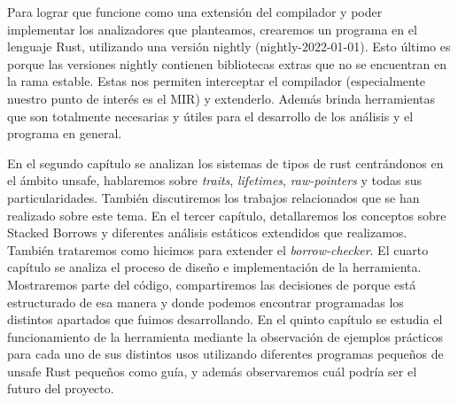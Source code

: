 Para lograr que funcione como una extensión del compilador y poder implementar los analizadores que planteamos, crearemos un programa en el lenguaje Rust, utilizando una versión nightly (nightly-2022-01-01). Esto último es porque las versiones nightly contienen bibliotecas extras que no se encuentran en la rama estable. Estas nos permiten interceptar el compilador (especialmente nuestro punto de interés es el MIR) y extenderlo. Además brinda herramientas que son totalmente necesarias y útiles para el desarrollo de los análisis y el programa en general.

En el segundo capítulo se analizan los sistemas de tipos de rust centrándonos en el ámbito unsafe, hablaremos sobre \textit{traits}, \textit{lifetimes}, \textit{raw-pointers} y todas sus particularidades. También discutiremos los trabajos relacionados que se han realizado sobre este tema.
En el tercer capítulo, detallaremos los conceptos sobre Stacked Borrows \citep{stackedborrows} y diferentes análisis estáticos extendidos que realizamos. También trataremos como hicimos para extender el \textit{borrow-checker}.
El cuarto capítulo se analiza el proceso de diseño e implementación de la herramienta. Mostraremos parte del código, compartiremos las decisiones de porque está estructurado de esa manera y donde podemos encontrar programadas los distintos apartados que fuimos desarrollando.
En el quinto capítulo se estudia el funcionamiento de la herramienta mediante la observación de ejemplos prácticos para cada uno de sus distintos usos utilizando diferentes programas pequeños de unsafe Rust pequeños como guía, y además observaremos cuál podría ser el futuro del proyecto.